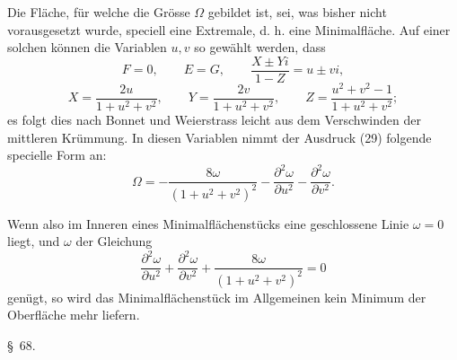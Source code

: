 \documentclass[11pt,a4paper,leqno]{article}
\begin{document}
Die Fläche, für welche die Grösse $\Omega$ gebildet ist, sei, was bisher
nicht vorausgesetzt wurde, speciell eine Extremale, d. h. eine
Minimalfläche. Auf einer solchen können die Variablen $u,v$ so gewählt
werden, dass
\[
F=0,\qquad E=G,\qquad \frac{X\pm Yi}{1-Z}=u\pm vi,
\]
\[
X=\frac{2u}{1+u^2+v^2},\qquad
Y=\frac{2v}{1+u^2+v^2},\qquad
Z=\frac{u^2+v^2-1}{1+u^2+v^2};
\]
es folgt dies nach Bonnet und Weierstrass leicht aus dem Verschwinden der
mittleren Krümmung. In diesen Variablen nimmt der Ausdruck (29) folgende
specielle Form an:
\[
\Omega=-\frac{8\omega}{(1+u^2+v^2)^2}
-\frac{\partial^2\omega}{\partial u^2}
-\frac{\partial^2\omega}{\partial v^2}.
\]

Wenn also im Inneren eines Minimalflächenstücks eine geschlossene Linie
$\omega=0$ liegt, und $\omega$ der Gleichung
\[
\frac{\partial^2\omega}{\partial u^2}
+\frac{\partial^2\omega}{\partial v^2}
+\frac{8\omega}{(1+u^2+v^2)^2}=0
\]
genügt, so wird das Minimalflächenstück im Allgemeinen kein Minimum der
Oberfläche mehr liefern.


\begin{center}
{\large \S~68.}
\end{center}
\end{document}
